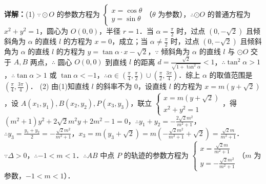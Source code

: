 \begin{question}[points=10]
\begin{solution}
\textbf{详解：}(1) $\because \odot O$ 的参数方程为 $\begin{cases} x=\cos\theta \\ y=\sin\theta \end{cases}$（$\theta$ 为参数），$\therefore \odot O$ 的普通方程为 $x^2+y^2=1$，圆心为 $O(0,0)$，半径 $r=1$．当 $\alpha=\frac{\pi}{2}$ 时，过点 $(0,-\sqrt{2})$ 且倾斜角为 $\alpha$ 的直线 $l$ 的方程为 $x=0$，成立；当 $\alpha\neq\frac{\pi}{2}$ 时，过点 $(0,-\sqrt{2})$ 且倾斜角为 $\alpha$ 的直线 $l$ 的方程为 $y=\tan\alpha\cdot x-\sqrt{2}$，$\because$ 倾斜角为 $\alpha$ 的直线 $l$ 与 $\odot O$ 交于 $A,B$ 两点，$\therefore$ 圆心 $O(0,0)$ 到直线 $l$ 的距离 $d=\frac{\sqrt{2}}{\sqrt{1+\tan^2\alpha}}<1$，$\therefore \tan^2\alpha>1$，$\therefore \tan\alpha>1$ 或 $\tan\alpha<-1$，$\therefore \alpha\in(\frac{\pi}{4},\frac{\pi}{2})\cup(\frac{\pi}{2},\frac{3\pi}{4})$．综上 $\alpha$ 的取值范围是 $(\frac{\pi}{4},\frac{3\pi}{4})$．
(2) 由(1)知直线 $l$ 的斜率不为 $0$，设直线 $l$ 的方程为 $x=m(y+\sqrt{2})$，设 $A(x_1,y_1),B(x_2,y_2),P(x_3,y_3)$，联立 $\begin{cases} x=m(y+\sqrt{2}) \\ x^2+y^2=1 \end{cases}$，得 $(m^2+1)y^2+2\sqrt{2}m^2y+2m^2-1=0$，$\therefore y_1+y_2=-\frac{2\sqrt{2}m^2}{m^2+1}$，$\therefore y_3=\frac{y_1+y_2}{2}=-\frac{\sqrt{2}m^2}{m^2+1}$，$x_3=m(y_3+\sqrt{2})=m(-\frac{\sqrt{2}m^2}{m^2+1}+\sqrt{2})=\frac{\sqrt{2}m}{m^2+1}$．$\because \Delta>0$，$\therefore -1<m<1$．$\therefore AB$ 中点 $P$ 的轨迹的参数方程为 $\begin{cases} x=\frac{\sqrt{2}m}{m^2+1} \\ y=-\frac{\sqrt{2}m^2}{m^2+1} \end{cases}$（$m$ 为参数，$-1<m<1$）．
\end{solution}
\end{question}

